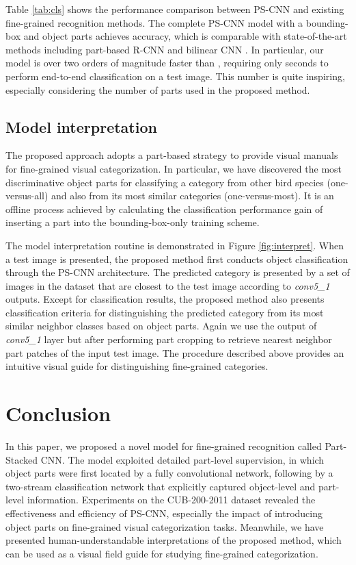 \documentclass[10pt,twocolumn,letterpaper]{article}
\begin{document}
Table \ref{tab:cls} shows the performance comparison between PS-CNN and existing fine-grained recognition methods. The complete PS-CNN model with a bounding-box and  object parts achieves  accuracy, which is comparable with state-of-the-art methods including part-based R-CNN \cite{zhang2014part} and bilinear CNN \cite{lin2015bilinear}. In particular, our model is over two orders of magnitude faster than \cite{zhang2014part}, requiring only  seconds to perform end-to-end classification on a test image. This number is quite inspiring, especially considering the number of parts used in the proposed method.




\subsection{Model interpretation}
The proposed approach adopts a part-based strategy to provide visual manuals for fine-grained visual categorization. In particular, we have discovered the most discriminative object parts for classifying a category from other bird species (one-versus-all) and also from its most similar categories (one-versus-most). It is an offline process achieved by calculating the classification performance gain of inserting a part into the bounding-box-only training scheme.

The model interpretation routine is demonstrated in Figure \ref{fig:interpret}. When a test image is presented, the proposed method first conducts object classification through the PS-CNN architecture. The predicted category is presented by a set of images in the dataset that are closest to the test image according to \textit{conv5\_1} outputs. Except for classification results, the proposed method also presents classification criteria for distinguishing the predicted category from its most similar neighbor classes based on object parts. Again we use the output of \textit{conv5\_1} layer but after performing part cropping to retrieve nearest neighbor part patches of the input test image. The procedure described above provides an intuitive visual guide for distinguishing fine-grained categories.




\section{Conclusion}\label{sec:conclusion}
In this paper, we proposed a novel model for fine-grained recognition called Part-Stacked CNN. The model exploited detailed part-level supervision, in which object parts were first located by a fully convolutional network, following by a two-stream classification network that explicitly captured object-level and part-level information. Experiments on the CUB-200-2011 dataset revealed the effectiveness and efficiency of PS-CNN, especially the impact of introducing object parts on fine-grained visual categorization tasks. Meanwhile, we have presented human-understandable interpretations of the proposed method, which can be used as a visual field guide for studying fine-grained categorization.
\end{document}
